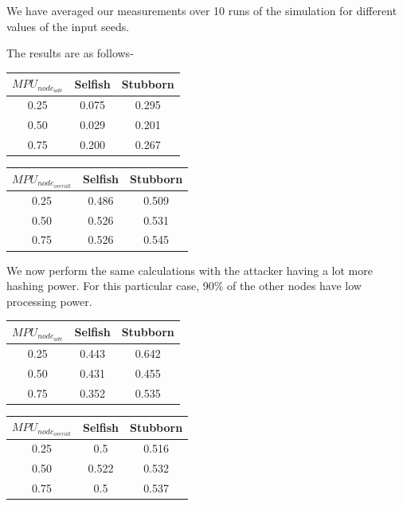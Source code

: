 \documentclass[a4paper,14pt]{article}
\begin{document}
We have averaged our measurements over 10 runs of the simulation for different values of the input seeds.

The results are as follows-
\begin{center}
    \begin{tabular}{|c|c|c|}
        \hline
        $MPU_{node_{adv}}$ & Selfish & Stubborn \\
        \hline
        0.25 & 0.075 &	0.295 \\
        0.50 & 0.029 & 0.201 \\
        0.75 & 0.200 & 0.267 \\
        \hline
    \end{tabular}
\end{center}



\begin{center}
    \begin{tabular}{|c|c|c|}
        \hline
        $MPU_{node_{overall}}$ & Selfish & Stubborn \\
        \hline
        0.25 & 0.486 &	0.509 \\
        0.50 & 0.526 & 0.531 \\
        0.75 & 0.526 & 0.545 \\
        \hline
    \end{tabular}
\end{center}


We now perform the same calculations with the attacker having a lot more hashing power. For this particular case, 90\% of the other nodes have low processing power.

\begin{center}
    \begin{tabular}{|c|c|c|}
        \hline
        $MPU_{node_{adv}}$ & Selfish & Stubborn \\
        \hline
        0.25 & 0.443 &	0.642 \\
        0.50 & 0.431 & 0.455 \\
        0.75 & 0.352 & 0.535 \\
        \hline
    \end{tabular}
\end{center}



\begin{center}
    \begin{tabular}{|c|c|c|}
        \hline
        $MPU_{node_{overall}}$ & Selfish & Stubborn \\
        \hline
        0.25 & 0.5 &	0.516 \\
        0.50 & 0.522 & 0.532 \\
        0.75 & 0.5 & 0.537 \\
        \hline
    \end{tabular}
\end{center}
\end{document}
